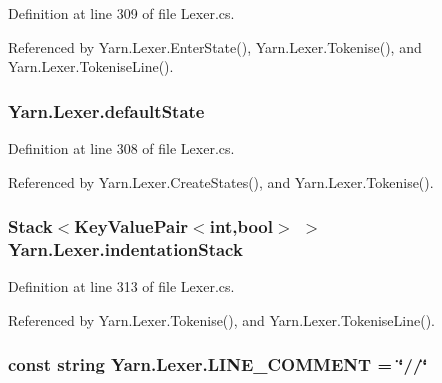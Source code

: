 Definition at line 309 of file Lexer.\-cs.



Referenced by Yarn.\-Lexer.\-Enter\-State(), Yarn.\-Lexer.\-Tokenise(), and Yarn.\-Lexer.\-Tokenise\-Line().

\hypertarget{a00121_a16b5dbf27a377cde5e8ba0eaa05b5710}{
\subsubsection[{default\-State}]{ Yarn.\-Lexer.\-default\-State\hspace{0.3cm}{\ttfamily [private]}}}\label{a00121_a16b5dbf27a377cde5e8ba0eaa05b5710}


Definition at line 308 of file Lexer.\-cs.



Referenced by Yarn.\-Lexer.\-Create\-States(), and Yarn.\-Lexer.\-Tokenise().

\hypertarget{a00121_a6631a1b1a9109258ab18927e7587ff9b}{
\subsubsection[{indentation\-Stack}]{\setlength{\rightskip}{0pt plus 5cm}Stack$<$Key\-Value\-Pair$<$int,bool$>$ $>$ Yarn.\-Lexer.\-indentation\-Stack\hspace{0.3cm}{\ttfamily [private]}}}\label{a00121_a6631a1b1a9109258ab18927e7587ff9b}


Definition at line 313 of file Lexer.\-cs.



Referenced by Yarn.\-Lexer.\-Tokenise(), and Yarn.\-Lexer.\-Tokenise\-Line().

\hypertarget{a00121_a29c457125cc4876f8571f5d9afa372e2}{
\subsubsection[{L\-I\-N\-E\-\_\-\-C\-O\-M\-M\-E\-N\-T}]{\setlength{\rightskip}{0pt plus 5cm}const string Yarn.\-Lexer.\-L\-I\-N\-E\-\_\-\-C\-O\-M\-M\-E\-N\-T = \char`\"{}//\char`\"{}\hspace{0.3cm}{\ttfamily [private]}}}\label{a00121_a29c457125cc4876f8571f5d9afa372e2}


